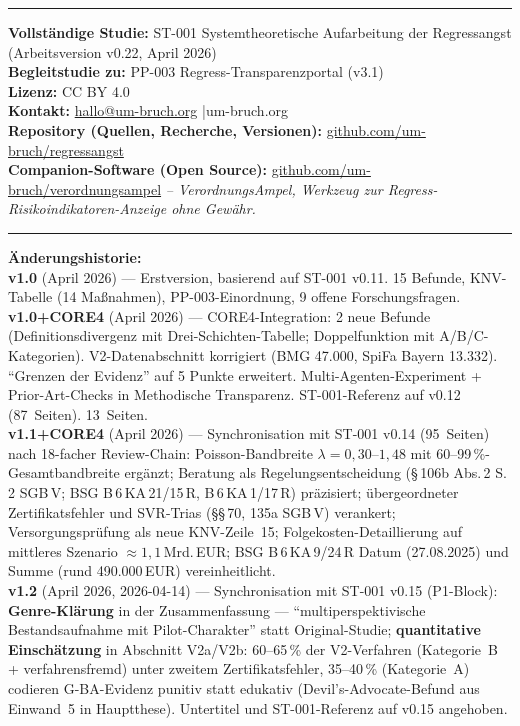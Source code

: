 \documentclass{umbruch-position}
\begin{document}
\vspace{4mm}
\noindent\rule{\textwidth}{0.4pt}

\vspace{2mm}
\noindent\textbf{Vollst\"andige Studie:} ST-001 Systemtheoretische Aufarbeitung der Regressangst (Arbeitsversion v0.22, April 2026)\\
\textbf{Begleitstudie zu:} PP-003 Regress-Transparenzportal (v3.1)\\
\textbf{Lizenz:} CC BY 4.0\\
\textbf{Kontakt:} \href{mailto:hallo@um-bruch.org}{hallo@um-bruch.org} \quad|\quad um-bruch.org\\
\textbf{Repository (Quellen, Recherche, Versionen):} \href{https://github.com/um-bruch/regressangst}{github.com/um-bruch/regressangst}\\
\textbf{Companion-Software (Open Source):} \href{https://github.com/um-bruch/verordnungsampel}{github.com/um-bruch/verordnungsampel} \textit{-- VerordnungsAmpel, Werkzeug zur Regress-Risikoindikatoren-Anzeige ohne Gew\"ahr.}

\vspace{4mm}
\noindent\rule{\textwidth}{0.4pt}

\vspace{2mm}
\noindent\textbf{Änderungshistorie:}\\
\textbf{v1.0} (April 2026) --- Erstversion, basierend auf ST-001 v0.11. 15 Befunde, KNV-Tabelle (14 Maßnahmen), PP-003-Einordnung, 9 offene Forschungsfragen.\\
\textbf{v1.0+CORE4} (April 2026) --- CORE4-Integration: 2 neue Befunde (Definitionsdivergenz mit Drei-Schichten-Tabelle; Doppelfunktion mit A/B/C-Kategorien). V2-Datenabschnitt korrigiert (BMG 47.000, SpiFa Bayern 13.332). ``Grenzen der Evidenz'' auf 5 Punkte erweitert. Multi-Agenten-Experiment + Prior-Art-Checks in Methodische Transparenz. ST-001-Referenz auf v0.12 (87~Seiten). 13~Seiten.\\
\textbf{v1.1+CORE4} (April 2026) --- Synchronisation mit ST-001 v0.14 (95~Seiten) nach 18-facher Review-Chain: Poisson-Bandbreite $\lambda = 0{,}30$--$1{,}48$ mit 60--99\,\%-Gesamtbandbreite erg\"anzt; Beratung als Regelungsentscheidung (\S\,106b Abs.\,2 S.\,2 SGB\,V; BSG B\,6\,KA\,21/15\,R, B\,6\,KA\,1/17\,R) pr\"azisiert; \"ubergeordneter Zertifikatsfehler und SVR-Trias (\S\S\,70, 135a SGB\,V) verankert; Versorgungspr\"ufung als neue KNV-Zeile~15; Folgekosten-Detaillierung auf mittleres Szenario $\approx 1{,}1$\,Mrd.\,EUR; BSG B\,6\,KA\,9/24\,R Datum (27.08.2025) und Summe (rund 490.000\,EUR) vereinheitlicht.\\
\textbf{v1.2} (April 2026, 2026-04-14) --- Synchronisation mit ST-001 v0.15 (P1-Block): \textbf{Genre-Kl\"arung} in der Zusammenfassung --- ``multiperspektivische Bestandsaufnahme mit Pilot-Charakter'' statt Original-Studie; \textbf{quantitative Einsch\"atzung} in Abschnitt V2a/V2b: 60--65\,\% der V2-Verfahren (Kategorie~B + verfahrensfremd) unter zweitem Zertifikatsfehler, 35--40\,\% (Kategorie~A) codieren G-BA-Evidenz punitiv statt edukativ (Devil's-Advocate-Befund aus Einwand~5 in Hauptthese). Untertitel und ST-001-Referenz auf v0.15 angehoben.
\end{document}

